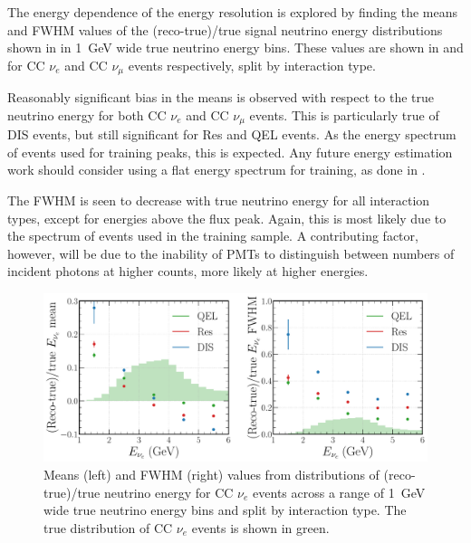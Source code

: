 The energy dependence of the energy resolution is explored by finding the means and FWHM values of
the (reco-true)/true signal neutrino energy distributions shown in
 in \SI{1}{GeV} wide true neutrino energy bins. These
values are shown in  and  for CC
$\nu_{e}$ and CC $\nu_{\mu}$ events respectively, split by interaction type.

Reasonably significant bias in the means is observed with respect to the true neutrino energy for
both CC $\nu_{e}$ and CC $\nu_{\mu}$ events. This is particularly true of DIS events, but still
significant for Res and QEL events. As the energy spectrum of events used for training peaks, this
is expected. Any future energy estimation work should consider using a flat energy spectrum for
training, as done in .

The FWHM is seen to decrease with true neutrino energy for all interaction types, except for
energies above the flux peak. Again, this is most likely due to the spectrum of events used in the
training sample. A contributing factor, however, will be due to the inability of PMTs to
distinguish between numbers of incident photons at higher counts, more likely at higher energies.

\begin{figure} %
    \includegraphics[width=\textwidth]{diagrams/7-results/final_energy_nuel.pdf}
    \caption[Means and FWHM values of $\nu_{e}$ energy distributions]
    {Means (left) and FWHM (right) values from distributions of (reco-true)/true neutrino energy
        for CC $\nu_{e}$ events across a range of \SI{1}{GeV} wide true neutrino energy bins and
        split by interaction type. The true distribution of CC $\nu_{e}$ events is shown in
        green.}
    \label{fig:final_energy_nuel}
\end{figure}

